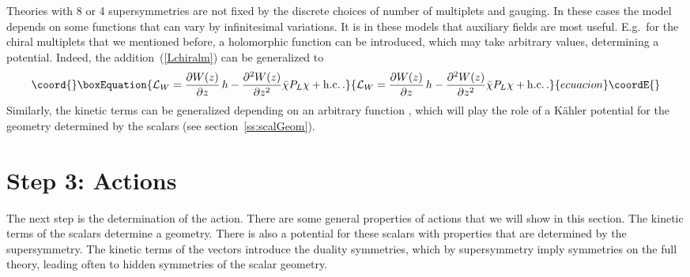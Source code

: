 \documentclass[a4paper,11pt,twoside]{article}
\providecommand{\Red}[1]{#1}
\providecommand{\OliveGreen}[1]{#1}
\providecommand{\Blue}[1]{#1}
\providecommand{\hc}{{\rm h.c.}}
\begin{document}
Theories with 8 or 4 supersymmetries are not fixed by the discrete
choices of number of multiplets and gauging. In these cases the model
depends on some functions that can vary by infinitesimal variations. It
is in these models that auxiliary fields are most useful. E.g.\ for the
chiral multiplets that we mentioned before, a holomorphic function
\myHighlight{$\OliveGreen{W}(\Blue{z})$}\coordHE{} can be introduced, which may take arbitrary
values, determining a potential. Indeed, the addition~(\ref{Lchiralm})
can be generalized to
\begin{equation}\coord{}\boxEquation{
  {\cal L}_W= \frac{\partial \OliveGreen{W}(\Blue{z})}{\partial \Blue{z}}\,\Red{h}
-\frac{\partial ^2\OliveGreen{W}(\Blue{z})}{\partial
\Blue{z}^2}\Blue{\bar \chi} P_L \Blue{\chi} +\hc \,.
 \label{LchiralW}
}{
  {\cal L}_W= \frac{\partial \OliveGreen{W}(\Blue{z})}{\partial \Blue{z}}\,\Red{h}
-\frac{\partial ^2\OliveGreen{W}(\Blue{z})}{\partial
\Blue{z}^2}\Blue{\bar \chi} P_L \Blue{\chi} +\hc \,.
 }{ecuacion}\coordE{}\end{equation}
Similarly, the kinetic terms can be generalized depending on an arbitrary
function \coordHE{}, which will play the role of a K{\"a}hler
potential for the geometry determined by the scalars (see
section~\ref{ss:scalGeom}).

\section{Step 3: Actions} \label{ss:actions}

The next step is the determination of the action. There are some general
properties of actions that we will show in this section. The kinetic
terms of the scalars determine a geometry. There is also a potential for
these scalars with properties that are determined by the supersymmetry.
The kinetic terms of the vectors introduce the duality symmetries, which
by supersymmetry imply symmetries on the full theory, leading often to
hidden symmetries of the scalar geometry.
\end{document}

